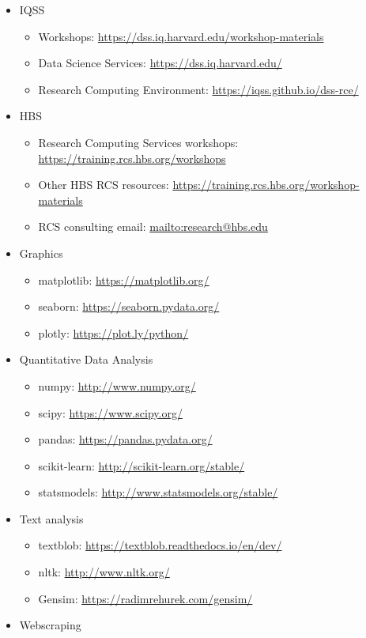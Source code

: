 \documentclass[]{book}
\providecommand{\tightlist}{%
  \setlength{\itemsep}{0pt}\setlength{\parskip}{0pt}}
\begin{document}
\begin{itemize}
\tightlist
\item
  IQSS

  \begin{itemize}
  \tightlist
  \item
    Workshops: \url{https://dss.iq.harvard.edu/workshop-materials}
  \item
    Data Science Services: \url{https://dss.iq.harvard.edu/}
  \item
    Research Computing Environment:
    \url{https://iqss.github.io/dss-rce/}
  \end{itemize}
\item
  HBS

  \begin{itemize}
  \tightlist
  \item
    Research Computing Services workshops:
    \url{https://training.rcs.hbs.org/workshops}
  \item
    Other HBS RCS resources:
    \url{https://training.rcs.hbs.org/workshop-materials}
  \item
    RCS consulting email: \url{mailto:research@hbs.edu}
  \end{itemize}
\item
  Graphics

  \begin{itemize}
  \tightlist
  \item
    matplotlib: \url{https://matplotlib.org/}
  \item
    seaborn: \url{https://seaborn.pydata.org/}
  \item
    plotly: \url{https://plot.ly/python/}
  \end{itemize}
\item
  Quantitative Data Analysis

  \begin{itemize}
  \tightlist
  \item
    numpy: \url{http://www.numpy.org/}
  \item
    scipy: \url{https://www.scipy.org/}
  \item
    pandas: \url{https://pandas.pydata.org/}
  \item
    scikit-learn: \url{http://scikit-learn.org/stable/}
  \item
    statsmodels: \url{http://www.statsmodels.org/stable/}
  \end{itemize}
\item
  Text analysis

  \begin{itemize}
  \tightlist
  \item
    textblob: \url{https://textblob.readthedocs.io/en/dev/}
  \item
    nltk: \url{http://www.nltk.org/}
  \item
    Gensim: \url{https://radimrehurek.com/gensim/}
  \end{itemize}
\item
  Webscraping


\end{itemize}
\end{document}
